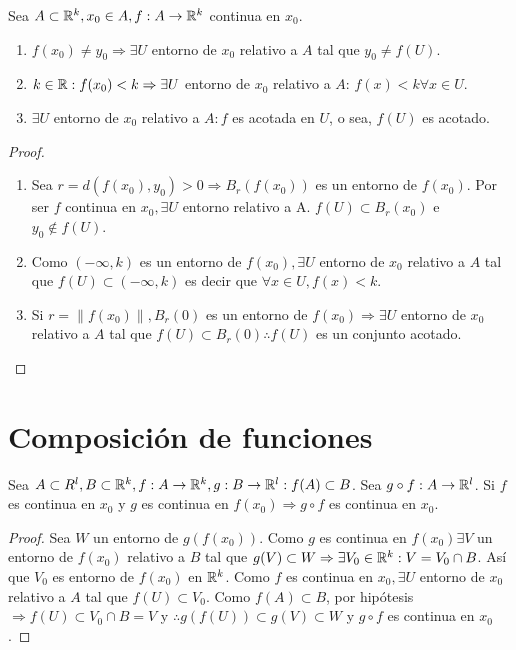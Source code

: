 \begin{prop}
  Sea \(A \subset \mathbb{R}^k, x_0 \in A, f: A \to \mathbb{R}^k\) continua en \(x_0\).
  \begin{enumerate}
    \item \(f(x_0) \neq y_0 \Rightarrow \exists U\) entorno de \(x_0\) relativo a \(A\) tal que \(y_0 \neq f(U)\).
    \item \(k \in \mathbb{R} : f(x_0) < k \Rightarrow \exists U\) entorno de \(x_0\) relativo a \(A\): \(f(x) < k \forall x \in U\).
    \item \(\exists U\) entorno de \(x_0\) relativo a \(A : f\) es acotada en \(U\), o sea, \(f(U)\) es acotado.
  \end{enumerate}

  \begin{proof}
    \begin{enumerate}
      \item Sea \(r = d(f(x_0), y_0) > 0 \Rightarrow B_r(f(x_0))\) es un entorno de \(f(x_0)\). Por ser \(f\) continua en \(x_0, \exists U\) entorno relativo a A. \(f(U) \subset B_r(x_0)\) e \(y_0 \notin f(U)\).
      \item Como \((-\infty, k)\) es un entorno de \(f(x_0), \exists U\) entorno de \(x_0\) relativo a \(A\) tal que \(f(U) \subset (-\infty, k)\) es decir que \(\forall x \in U, f(x) < k\).
      \item Si \(r = \|f(x_0)\|, B_r(0)\) es un entorno de \(f(x_0) \Rightarrow \exists U\) entorno de \(x_0\) relativo a \(A\) tal que \(f(U) \subset B_r(0) \therefore f(U)\) es un conjunto acotado.
    \end{enumerate}
  \end{proof}
\end{prop}

\section{Composición de funciones}

\begin{theorem}
  Sea \(A \subset R^l, B \subset \mathbb{R}^k, f: A \to \mathbb{R}^k, g: B \to \mathbb{R}^l : f(A) \subset B\). Sea \(g \circ f: A \to \mathbb{R}^l\). Si \(f\) es continua en \(x_0\) y \(g\) es continua en \(f(x_0) \Rightarrow g \circ f\) es continua en \(x_0\).
  \begin{proof}
    Sea \(W\) un entorno de \(g(f(x_0))\). Como \(g\) es continua en \(f(x_0) \exists V\) un entorno de \(f(x_0)\) relativo a \(B\) tal que \(g(V) \subset W \Rightarrow \exists V_0 \in \mathbb{R}^k : V = V_0 \cap B\). Así que \(V_0\) es entorno de \(f(x_0)\) en \(\mathbb{R}^k\). Como \(f\) es continua en \(x_0, \exists U\) entorno de \(x_0\) relativo a \(A\) tal que \(f(U) \subset V_0\). Como \(f(A) \subset B\), por hipótesis \(\Rightarrow f(U) \subset V_0 \cap B = V\) y \(\therefore g(f(U)) \subset g(V) \subset W\) y \(g \circ f\) es continua en \(x_0\).
  \end{proof}
\end{theorem}

